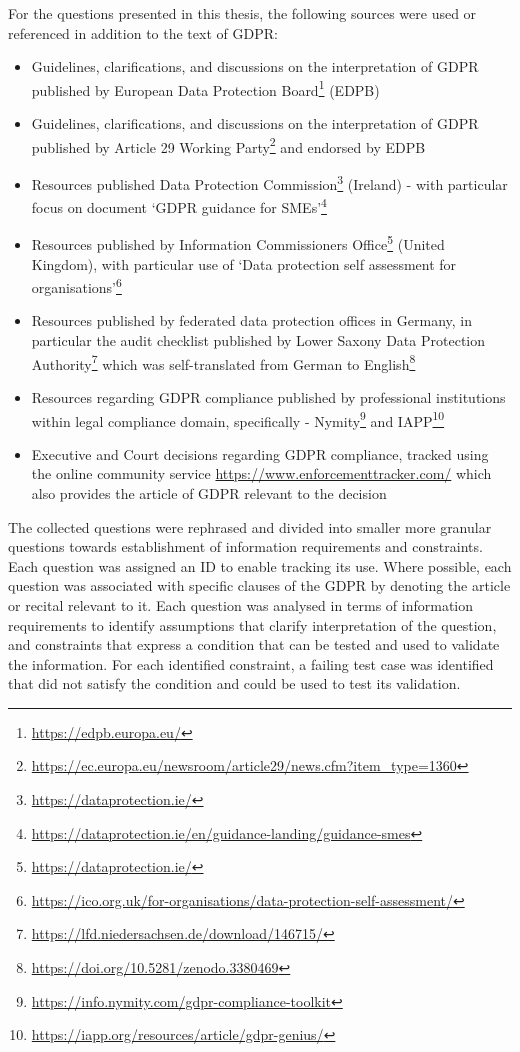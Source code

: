 For the questions presented in this thesis, the following sources were used or referenced in addition to the text of GDPR:
\begin{itemize}
    \item Guidelines, clarifications, and discussions on the interpretation of GDPR published by European Data Protection Board\footnote{\url{https://edpb.europa.eu/}} (EDPB)
    \item Guidelines, clarifications, and discussions on the interpretation of GDPR published by Article 29 Working Party\footnote{\url{https://ec.europa.eu/newsroom/article29/news.cfm?item_type=1360}} and endorsed by EDPB
    \item Resources published Data Protection Commission\footnote{\url{https://dataprotection.ie/}} (Ireland) - with particular focus on document `GDPR guidance for SMEs'\footnote{\url{https://dataprotection.ie/en/guidance-landing/guidance-smes}}
    \item Resources published by Information Commissioners Office\footnote{\url{https://dataprotection.ie/}} (United Kingdom), with particular use of `Data protection self assessment for organisations'\footnote{\url{https://ico.org.uk/for-organisations/data-protection-self-assessment/}}
    \item Resources published by federated data protection offices in Germany, in particular the audit checklist published by Lower Saxony Data Protection Authority\footnote{\url{https://lfd.niedersachsen.de/download/146715/}} which was self-translated from German to English\footnote{\url{https://doi.org/10.5281/zenodo.3380469}}
    \item Resources regarding GDPR compliance published by professional institutions within legal compliance domain, specifically - Nymity\footnote{\url{https://info.nymity.com/gdpr-compliance-toolkit}} and IAPP\footnote{\url{https://iapp.org/resources/article/gdpr-genius/}}
    \item Executive and Court decisions regarding GDPR compliance, tracked using the online community service \url{https://www.enforcementtracker.com/} which also provides the article of GDPR relevant to the decision
\end{itemize}

The collected questions were rephrased and divided into smaller more granular questions towards establishment of information requirements and constraints. 
Each question was assigned an ID to enable tracking its use.
Where possible, each question was associated with specific clauses of the GDPR by denoting the article or recital relevant to it. Each question was analysed in terms of information requirements to identify assumptions that clarify interpretation of the question, and constraints that express a condition that can be tested and used to validate the information. For each identified constraint, a failing test case was identified that did not satisfy the condition and could be used to test its validation.

